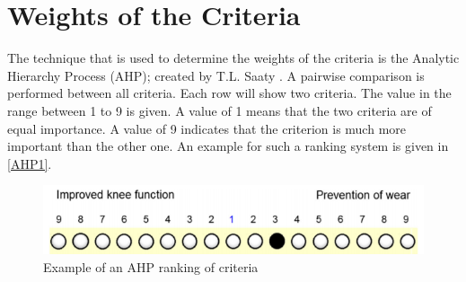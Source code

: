     
  








    
    

    

    
    
\section{Weights of the Criteria}
\label{AHPMethod}
The technique that is used to determine the weights of the criteria is the Analytic Hierarchy Process (AHP); created by T.L. Saaty \cite{AHP}. A pairwise comparison is performed between all criteria. Each row will show two criteria. The value in the range between 1 to 9 is given. A value of 1 means that the two criteria are of equal importance. A value of 9 indicates that the criterion is much more important than the other one. An example for such a ranking system is given in \autoref{AHP1}.

\begin{figure}[H]
    \centering
    \includegraphics[width=0.75\linewidth]{Figures/AHP1.PNG}
    \captionsetup{justification=centering}
    \caption{Example of an AHP ranking of criteria \cite{AHPtut}}
    \label{AHP1}
\end{figure}

